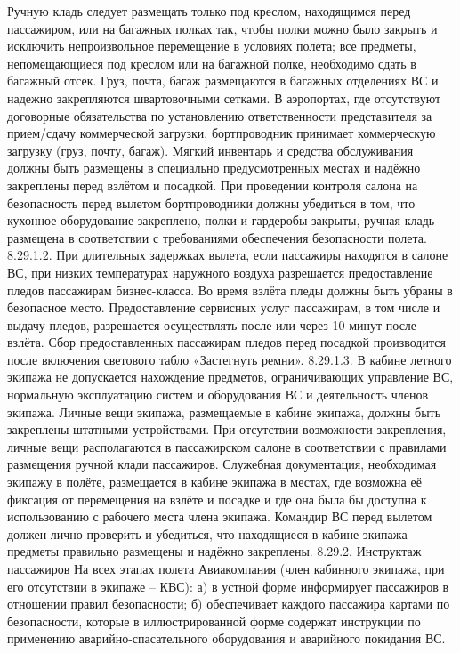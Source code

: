 Ручную кладь следует размещать только под креслом, находящимся перед пассажиром, или на багажных полках так, чтобы полки можно было закрыть и исключить непроизвольное перемещение в условиях полета; все предметы, непомещающиеся под креслом или на багажной полке, необходимо сдать в багажный отсек.
Груз, почта, багаж размещаются в багажных отделениях ВС и надежно закрепляются швартовочными сетками. В аэропортах, где отсутствуют договорные обязательства по установлению ответственности представителя за прием/сдачу коммерческой загрузки, бортпроводник принимает коммерческую загрузку (груз, почту, багаж).
Мягкий инвентарь и средства обслуживания должны быть размещены в специально предусмотренных местах и надёжно закреплены перед взлётом и посадкой.
При проведении контроля салона на безопасность перед вылетом бортпроводники должны убедиться в том, что кухонное оборудование закреплено, полки и гардеробы закрыты, ручная кладь размещена в соответствии с требованиями обеспечения безопасности полета.
8.29.1.2. При длительных задержках вылета, если пассажиры находятся в салоне ВС, при низких температурах наружного воздуха разрешается предоставление пледов пассажирам бизнес-класса. Во время взлёта пледы должны быть убраны в безопасное место.
Предоставление сервисных услуг пассажирам, в том числе и выдачу пледов, разрешается осуществлять после или через 10 минут после взлёта.
Сбор предоставленных пассажирам пледов перед посадкой производится после включения светового табло «Застегнуть ремни».
8.29.1.3. В кабине летного экипажа не допускается нахождение предметов, ограничивающих управление ВС, нормальную эксплуатацию систем и оборудования ВС и деятельность членов экипажа.
Личные вещи экипажа, размещаемые в кабине экипажа, должны быть закреплены штатными устройствами.
При отсутствии возможности закрепления, личные вещи располагаются в пассажирском салоне в соответствии с правилами размещения ручной клади пассажиров.
Служебная документация, необходимая экипажу в полёте, размещается в кабине экипажа в местах, где возможна её фиксация от перемещения на взлёте и посадке и где она была бы доступна к использованию с рабочего места члена экипажа.
Командир ВС перед вылетом должен лично проверить и убедиться, что находящиеся в кабине экипажа предметы правильно размещены и надёжно закреплены.
8.29.2.	Инструктаж пассажиров
На всех этапах полета Авиакомпания (член кабинного экипажа, при его отсутствии в экипаже – КВС):
а)	в устной форме информирует пассажиров в отношении правил безопасности;
б)	обеспечивает каждого пассажира картами по безопасности, которые в иллюстрированной форме содержат инструкции по применению аварийно-спасательного оборудования и аварийного покидания ВС.
